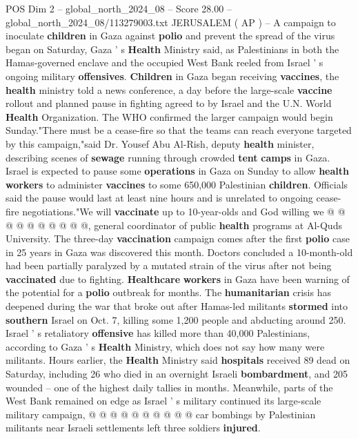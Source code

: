 \begin{textsample}{POS Dim 2 – global\_north\_2024\_08 – Score 28.00 – global\_north\_2024\_08/113279003.txt}  \label{ex:f2_pos_396}
JERUSALEM ( AP ) -- A campaign to inoculate \textbf{children} in Gaza against \textbf{polio} and prevent the spread of the virus began on Saturday, Gaza ' s \textbf{Health} Ministry said, as Palestinians in both the Hamas-governed enclave and the occupied West Bank reeled from Israel ' s ongoing military \textbf{offensives}. \textbf{Children} in Gaza began receiving \textbf{vaccines}, the \textbf{health} ministry told a news conference, a day before the large-scale \textbf{vaccine} rollout and planned pause in fighting agreed to by Israel and the U.N.
World \textbf{Health} Organization.
The WHO confirmed the larger campaign would begin Sunday."There must be a cease-fire so that the teams can reach everyone targeted by this campaign,"said Dr.
Yousef Abu Al-Rish, deputy \textbf{health} minister, describing scenes of \textbf{sewage} running through crowded \textbf{tent} \textbf{camps} in Gaza.
Israel is expected to pause some \textbf{operations} in Gaza on Sunday to allow \textbf{health} \textbf{workers} to administer \textbf{vaccines} to some 650,000 Palestinian \textbf{children}.
Officials said the pause would last at least nine hours and is unrelated to ongoing cease-fire negotiations."We will \textbf{vaccinate} up to 10-year-olds and God willing we @ @ @ @ @ @ @ @ @ @, general coordinator of public \textbf{health} programs at Al-Quds University.
The three-day \textbf{vaccination} campaign comes after the first \textbf{polio} case in 25 years in Gaza was discovered this month.
Doctors concluded a 10-month-old had been partially paralyzed by a mutated strain of the virus after not being \textbf{vaccinated} due to fighting. \textbf{Healthcare} \textbf{workers} in Gaza have been warning of the potential for a \textbf{polio} outbreak for months.
The \textbf{humanitarian} crisis has deepened during the war that broke out after Hamas-led militants \textbf{stormed} into \textbf{southern} Israel on Oct. 7, killing some 1,200 people and abducting around 250.
Israel ' s retaliatory \textbf{offensive} has killed more than 40,000 Palestinians, according to Gaza ' s \textbf{Health} Ministry, which does not say how many were militants.
Hours earlier, the \textbf{Health} Ministry said \textbf{hospitals} received 89 dead on Saturday, including 26 who died in an overnight Israeli \textbf{bombardment}, and 205 wounded -- one of the highest daily tallies in months.
Meanwhile, parts of the West Bank remained on edge as Israel ' s military continued its large-scale military campaign, @ @ @ @ @ @ @ @ @ @ car bombings by Palestinian militants near Israeli settlements left three soldiers \textbf{injured}.

\end{textsample}
